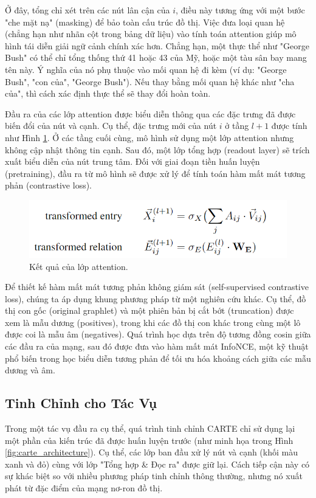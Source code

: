 \documentclass{article}
\begin{document}
Ở đây, tổng chỉ xét trên các nút lân cận của $i$, điều này tương ứng với một bước "che mặt nạ" (masking) để bảo toàn cấu trúc đồ thị. Việc đưa loại quan hệ (chẳng hạn như nhãn cột trong bảng dữ liệu) vào tính toán attention giúp mô hình tái diễn giải ngữ cảnh chính xác hơn. Chẳng hạn, một thực thể như "George Bush" có thể chỉ tổng thống thứ 41 hoặc 43 của Mỹ, hoặc một tàu sân bay mang tên này. Ý nghĩa của nó phụ thuộc vào mối quan hệ đi kèm (ví dụ: "George Bush", "con của", "George Bush"). Nếu thay bằng mối quan hệ khác như "cha của", thì cách xác định thực thể sẽ thay đổi hoàn toàn.

Đầu ra của các lớp attention được biểu diễn thông qua các đặc trưng đã được biến đổi của nút và cạnh. Cụ thể, đặc trưng mới của nút $i$ ở tầng $l+1$ được tính như Hình \ref{fig:attention_layers_output}. Ở các tầng cuối cùng, mô hình sử dụng một lớp attention nhưng không cập nhật thông tin cạnh. Sau đó, một lớp tổng hợp (readout layer) sẽ trích xuất biểu diễn của nút trung tâm. Đối với giai đoạn tiền huấn luyện (pretraining), đầu ra từ mô hình sẽ được xử lý để tính toán hàm mất mát tương phản (contrastive loss).

\begin{figure} 
    \centering
    \includegraphics[scale = 0.8]{attention_layers_output.png}
    \caption{Kết quả của lớp attention.}
    \label{fig:attention_layers_output}
\end{figure}

Để thiết kế hàm mất mát tương phản không giám sát (self-supervised contrastive loss), chúng ta áp dụng khung phương pháp từ một nghiên cứu khác. Cụ thể, đồ thị con gốc (original graphlet) và một phiên bản bị cắt bớt (truncation) được xem là mẫu dương (positives), trong khi các đồ thị con khác trong cùng một lô được coi là mẫu âm (negatives). Quá trình học dựa trên độ tương đồng cosin giữa các đầu ra của mạng, sau đó được đưa vào hàm mất mát InfoNCE, một kỹ thuật phổ biến trong học biểu diễn tương phản để tối ưu hóa khoảng cách giữa các mẫu dương và âm.



\subsection{Tinh Chỉnh cho Tác Vụ}
Trong một tác vụ đầu ra cụ thể, quá trình tinh chỉnh CARTE chỉ sử dụng lại một phần của kiến trúc đã được huấn luyện trước (như minh họa trong Hình \ref{fig:carte_architecture}). Cụ thể, các lớp ban đầu xử lý nút và cạnh (khối màu xanh và đỏ) cùng với lớp "Tổng hợp \& Đọc ra" được giữ lại. Cách tiếp cận này có sự khác biệt so với nhiều phương pháp tinh chỉnh thông thường, nhưng nó xuất phát từ đặc điểm của mạng nơ-ron đồ thị.
\end{document}
